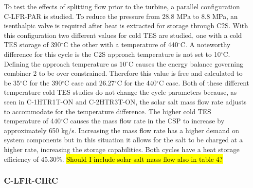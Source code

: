 \begin{paracol}{2}
To test the effects of splitting flow prior to the turbine, a parallel configuration C-LFR-PAR is studied. To reduce the pressure from 28.8 MPa to 8.8 MPa, an isenthalpic valve is required after heat is extracted for storage through C2S. With this configuration two different values for cold TES are studied, one with a cold TES storage of 390$^{\circ}$C the other with a temperature of 440$^{\circ}$C. A noteworthy difference for this cycle is the C2S approach temperature is not set to 10$^{\circ}$C. Defining the approach temperature as 10$^{\circ}$C causes the energy balance governing combiner 2 to be over constrained. Therefore this value is free and calculated to be 35$^{\circ}$C for the 390$^{\circ}$C case and 26.27$^{\circ}$C for the 440$^{\circ}$C case. Both of these different temperature cold TES studies do not change the cycle parameters because, as seen in C-1HTR1T-ON and C-2HTR3T-ON, the solar salt mass flow rate adjusts to accommodate for the temperature difference. The higher cold TES temperature of 440$^{\circ}$C causes the mass flow rate in the CSP to increase by approximately 650 kg/s. Increasing the mass flow rate has a higher demand on system components but in this situation it allows for the salt to be charged at a higher rate, increasing the storage capabilities. Both cycles have a heat storage efficiency of 45.30\%. \hl{Should I include solar salt mass flow also in table 4?}

\subsubsection{C-LFR-CIRC}


\end{paracol}

